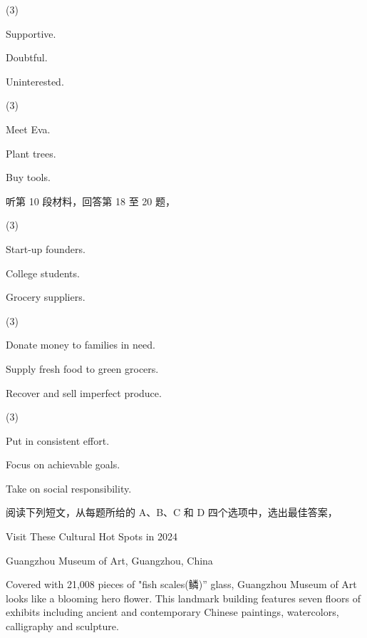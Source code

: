 \documentclass{英语试卷}
\begin{document}
\begin{choices}(3)
  \item Supportive.
  \item Doubtful.
  \item Uninterested.
\end{choices}
\begin{choices}(3)
  \item Meet Eva.
  \item Plant trees.
  \item Buy tools.
\end{choices}
\par 听第 10 段材料，回答第 18 至 20 题，\par
{}
\begin{choices}(3)
  \item Start-up founders.
  \item College students.
  \item Grocery suppliers.
\end{choices}
\begin{choices}(3)
  \item Donate money to families in need.
  \item Supply fresh food to green grocers.
  \item Recover and sell imperfect produce.
\end{choices}
\begin{choices}(3)
  \item Put in consistent effort.
  \item Focus on achievable goals.
  \item Take on social responsibility.
\end{choices}
\par 阅读下列短文，从每题所给的 A、B、C 和 D 四个选项中，选出最佳答案，\par
\par Visit These Cultural Hot Spots in 2024\par
\par Guangzhou Museum of Art, Guangzhou, China\par
\par Covered with 21,008 pieces of "fish scales(鳞)” glass, Guangzhou Museum of Art looks like a blooming hero flower. This landmark building features seven floors of exhibits including ancient and contemporary Chinese paintings, watercolors, calligraphy and sculpture.\par
\end{document}
